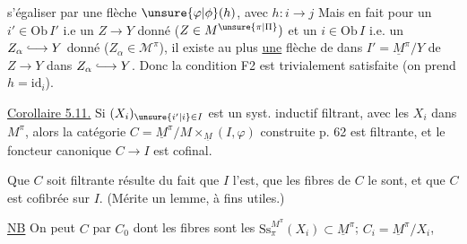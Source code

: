 
s'égaliser par une flèche $\unsure{\varphi|\phi}(h)$, avec $h:i\longrightarrow j$  Mais en fait  pour un $i'\in\mathrm{Ob}\,I'$ i.e un $Z\longrightarrow Y$ donné ($Z\in M^{\unsure{\pi|\Pi}})$ et un $i\in\mathrm{Ob}\,I$ i.e. un $Z_\alpha\lhook\joinrel\longrightarrow Y$ donné ($Z_\alpha\in\mathcal M^\pi$), il existe au plus \uline{une} flèche de  dans $I'=\underline M^\pi/Y$ de $Z\longrightarrow Y$ dans $Z_\alpha\lhook\joinrel\longrightarrow Y$. Donc la condition F2 est trivialement satisfaite (on prend  $h=\mathrm{id}_i$).

\uline{Corollaire 5.11.} Si $(X_i)_{\unsure{i'|i}\in I}$ est un syst. inductif filtrant, avec les $X_i$ dans $M^\pi$, alors la catégorie $C=\underline M^\pi/M\times_{\underline{M}}(I,\varphi)$ construite p. 62 est filtrante, et le foncteur canonique  $C\longrightarrow I$ est cofinal.

 Que $C$ soit filtrante  résulte  du fait que $I$ l'est,  que les fibres de $C$ le sont, et que $C$ est cofibrée sur $I$. (Mérite un lemme, à  fins utiles.) 

 \uline{NB} On peut  $C$ par $C_0$ dont les fibres sont les $\mathrm{Ss}^{M^\pi}_{\pi}(X_i)\subset\underline M^{\pi}$;  $C_i=\underline M^\pi/X_i$,

